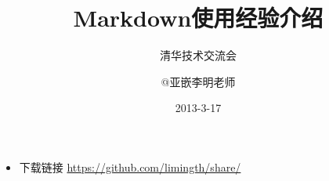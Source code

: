 \documentclass[10pt]{beamer}
\title{Markdown使用经验介绍}
\subtitle{清华技术交流会}
\author{@亚嵌李明老师}
\date{2013-3-17}
\institute{http://weibo.com/limingth}
\begin{document}
\begin{frame}
\titlepage
\begin{itemize}
\item 	下载链接 \url{https://github.com/limingth/share/}
\end{itemize}
\end{frame}


\end{document}
